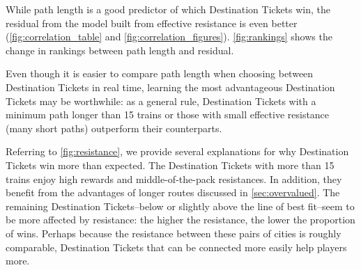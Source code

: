 \begin{multicols}{2}

While path length is a good predictor 
of which Destination Tickets win, 
the residual from the model built from effective resistance
is even better (\cref{fig:correlation_table} and
\cref{fig:correlation_figures}).
\cref{fig:rankings} shows the change in rankings
between path length and residual.

Even though it is easier to compare path length when choosing
between Destination Tickets in real time,
learning the most advantageous Destination Tickets may be worthwhile:
as a general rule, Destination Tickets with a minimum path
longer than 15 trains or those with small effective resistance
(many short paths) outperform their counterparts.

Referring to \cref{fig:resistance}, 
we provide several explanations for why Destination Tickets 
win more than expected.
The Destination Tickets with more than 15 trains 
enjoy high rewards and middle-of-the-pack 
resistances.
In addition, they benefit from the advantages of longer 
routes discussed in \cref{sec:overvalued}.
The remaining Destination Tickets--below or slightly 
above the line of best fit--seem to be more affected
by resistance: the higher the resistance, the
lower the proportion of wins.
Perhaps because the resistance between these pairs of cities
is roughly comparable, Destination Tickets that 
can be connected more easily help players more.


\end{multicols}
